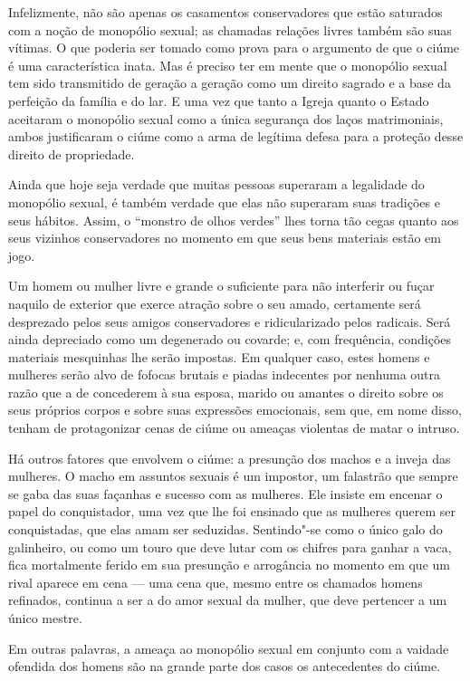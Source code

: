 Infelizmente, não são apenas os casamentos conservadores que estão
saturados com a noção de monopólio sexual; as chamadas relações livres
também são suas vítimas. O que poderia ser tomado como prova para o argumento de que o ciúme é uma característica inata. Mas é
preciso ter em mente que o monopólio sexual tem sido transmitido de
geração a geração como um direito sagrado e a base da perfeição da
família e do lar. E uma vez que tanto a Igreja quanto o Estado
aceitaram o monopólio sexual como a única segurança dos laços
matrimoniais, ambos justificaram o ciúme como a arma de legítima defesa
para a proteção desse direito de propriedade.

Ainda que hoje seja verdade que muitas pessoas superaram a legalidade do
monopólio sexual, é também verdade que elas não superaram suas tradições
e seus hábitos. Assim, o ``monstro de olhos verdes'' lhes torna tão
cegas quanto aos seus vizinhos conservadores no momento em que seus bens
materiais estão em jogo.

Um homem ou mulher livre e grande o suficiente para não interferir ou
fuçar naquilo de exterior que exerce atração sobre o seu amado,
certamente será desprezado pelos seus amigos conservadores e
ridicularizado pelos radicais. Será ainda depreciado como um degenerado
ou covarde; e, com frequência, condições materiais mesquinhas lhe serão
impostas. Em qualquer caso, estes homens e mulheres serão alvo de
fofocas brutais e piadas indecentes por nenhuma outra razão que a de
concederem à sua esposa, marido ou amantes o direito sobre os seus
próprios corpos e sobre suas expressões emocionais, sem que, em nome
disso, tenham de protagonizar cenas de ciúme ou ameaças violentas de
matar o intruso.

Há outros fatores que envolvem o ciúme: a presunção dos machos e a
inveja das mulheres. O macho em assuntos sexuais é um impostor, um
falastrão que sempre se gaba das suas façanhas e sucesso com as
mulheres. Ele insiste em encenar o papel do conquistador, uma vez que
lhe foi ensinado que as mulheres querem ser conquistadas, que elas amam
ser seduzidas. Sentindo"-se como o único galo do galinheiro, ou como um
touro que deve lutar com os chifres para ganhar a vaca, fica mortalmente
ferido em sua presunção e arrogância no momento em que um rival aparece
em cena --- uma cena que, mesmo entre os chamados homens refinados,
continua a ser a do amor sexual da mulher, que deve pertencer a um único
mestre.

Em outras palavras, a ameaça ao monopólio sexual em conjunto com a
vaidade ofendida dos homens são na grande parte dos casos os
antecedentes do ciúme.


